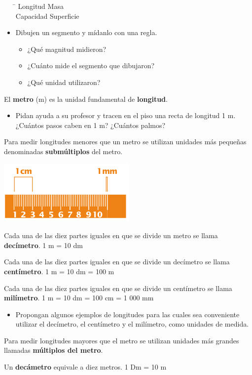 \documentclass[letterpaper,11pt,twoside]{article}
\begin{document}
\begin{multicols}{2}
\begin{itemize}
\begin{tabbing}
\hspace{3cm}\=\kill
Longitud \> Masa \\ 
Capacidad \> Superficie 
\end{tabbing}
\item Dibujen un segmento y mídanlo con una regla.
\begin{itemize}
\item ¿Qué magnitud midieron?
\item ¿Cuánto mide el segmento que dibujaron?
\item ¿Qué unidad utilizaron?
\end{itemize}
\end{itemize}
El \textbf{metro} (m) es la unidad fundamental de \textbf{longitud}.
\begin{itemize}
\item Pidan ayuda a su profesor y tracen en el piso una recta de longitud 1 m. ¿Cuántos pasos caben en 1 m? ¿Cuántos palmos?
\end{itemize}
Para medir longitudes menores que un metro se utilizan unidades más pequeñas denominadas \textbf{submúltiplos} del metro.
\begin{center}
\includegraphics[scale=.9]{Images/regla.png} 
\end{center}
Cada una de las diez partes iguales en que se divide un metro se llama \textbf{decímetro}. 1 m = 10 dm

Cada una de las diez partes iguales en que se divide un decímetro se llama \textbf{centímetro}. 1 m = 10 dm = 100 m

Cada una de las diez partes iguales en que se divide un centímetro se llama \textbf{milímetro}. 1 m = 10 dm = 100 cm = 1 000 mm
\begin{itemize}
\item Propongan algunos ejemplos de longitudes para las cuales sea conveniente utilizar el decímetro, el centímetro y el milímetro, como unidades de medida.
\end{itemize}
Para medir longitudes mayores que el metro se utilizan unidades más grandes llamadas \textbf{múltiplos del metro}.

Un \textbf{decámetro} equivale a diez metros. 1 Dm = 10 m


\end{multicols}
\end{document}
